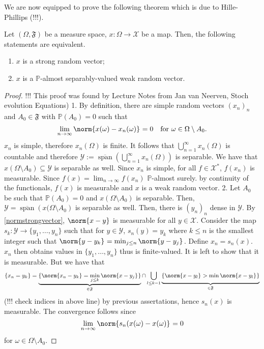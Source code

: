 We are now equipped to prove the following theorem which is due to Hille-Phillips (!!!).

\begin{thm}[]
  \label{equivalencevectors}
    Let \( (\Omega , \mathfrak{F}) \)  be a measure space, \( x: \Omega \to \mathcal{X} \) be a map. Then, the following statements are equivalent.
    \begin{enumerate}[1)]
      \item \( x \) is a strong random vector;
      \item \( x \) is a \( \mathbb{P} \)-almost separably-valued weak random vector.
    \end{enumerate}
    
\end{thm}

\begin{proof}
  !!! This proof was found by Lecture Notes from Jan van Neerven, Stoch evolution Equations)
    1. By definition, there are simple random vectors \( (x_n)_n \) and \( A_0 \in \mathfrak{F} \) with \( \mathbb{P}(A_0)=0 \) such that 
    \[ \lim_{n \to \infty}\norm{x(\omega )-x_n(\omega )}_{}=0 \quad \text{for \( \omega \in \Omega  \setminus A_0 \).}\]
    \( x_n \) is simple, therefore \( x_n(\Omega ) \) is finite. It follows that \( \bigcup_{n=1}^{\infty } x_n(\Omega ) \) is countable and therefore \( \mathcal{Y}:= \overline{\operatorname{span}}\left(\bigcup_{n=1}^{\infty } x_n(\Omega ) \right) \) is separable. We have that \( x(\Omega \setminus A_0) \subseteq \mathcal{Y} \) is separable as well. Since \( x_n \) is simple, for all \( f \in \mathcal{X}^{*} \), \( f(x_n) \) is measurable. Since \( f(x)=\lim_{n \to \infty}f(x_n) \) \( \mathbb{P} \)-almost surely. by continuity of the functionals, \( f(x) \) is measurable and \( x \) is a weak random vector.
    2. Let \( A_0 \) be such that \( \mathbb{P}(A_0)=0 \) and \( x(\Omega \setminus A_0) \) is separable. Then, \( \mathcal{Y}= \overline{\operatorname{span}}\left(x(\Omega  \setminus A_0\right) \)  is separable as well. Then, there is \( \left(y_n\right)_n \) dense in \( \mathcal{Y} \). By \ref{normstrongvector}, \( \norm{x-y}_{} \) is measurable for all \( y \in \mathcal{X} \). 
    Consider the map \( s_k: \mathcal{Y} \to \{y_1,\dots, y_n\} \) such that for \( y \in  \mathcal{Y} \), \( s_n(y)=y_k \) where \( k \leq n \) is the smallest integer such that \( \norm{y-y_k}_{}= \min_{j \leq n} \norm{y-y_j}_{} \). Define \( x_n=s_n(x) \). \( x_n \) then obtains values in \( \{y_1,\dots,y_n\} \) thus is finite-valued. It is left to show that it is measurable. But we have that 
    \[ \{x_n=y_k\}= \underbrace{\{ \norm{x_n-y_k}= \min_{j\leq k} \norm{x-y_j}_{}\}}_{\in \mathfrak{F}} \cap  \bigcup_{l \leq k-1} \underbrace{\{\norm{x-y_l}_{}> \min_{} \norm{x-y_l}_{}\}}_{\in \mathfrak{F}}\] 
    (!!! check indices in above line)
    by previous assertations, hence \( s_n(x) \) is measurable. The convergence follows since \[ \lim_{n \to \infty} \norm{s_n(x(\omega )- x(\omega )}_{}=0 \] for \( \omega  \in \Omega  \setminus A_0 \).
\end{proof}

